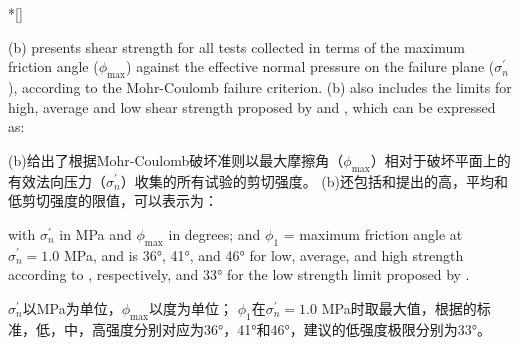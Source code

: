 \begin{ParaColumn}

    \switchcolumn[0]*[]

    (b) presents shear strength for all tests collected in terms of the maximum friction angle ($\phi_{\max}$) against the effective normal pressure on the failure plane ($\sigma_n^\prime$), according to the Mohr-Coulomb failure criterion. (b) also includes the limits for high, average and low shear strength proposed by \citet{Leps19701159} and \citet{Indraratna1994539}, which can be expressed as:

    \switchcolumn

    (b)给出了根据Mohr-Coulomb破坏准则以最大摩擦角（$\phi_{\max}$）相对于破坏平面上的有效法向压力（$\sigma_n^\prime$）收集的所有试验的剪切强度。 (b)还包括\citet{Leps19701159}和\citet{Indraratna1994539}提出的高，平均和低剪切强度的限值，可以表示为：


    \switchcolumn*

    \noindent
    with $\sigma_n^\prime$ in MPa and $\phi_{\max}$ in degrees; and $\phi_1$ = maximum friction angle at $\sigma_n^\prime=1.0$ MPa, and is 36°, 41°, and 46° for low, average, and high strength according to \citet{Leps19701159}, respectively, and 33° for the low strength limit proposed by \citet{Indraratna1994539}.

    \switchcolumn

    \noindent
    $\sigma_n^\prime$以MPa为单位，$\phi_{\max}$以度为单位； $\phi_1$在$\sigma_n^\prime=1.0$ MPa时取最大值，根据\citet{Leps19701159}的标准，低，中，高强度分别对应为36°，41°和46°，\citet{Indraratna1994539}建议的低强度极限分别为33°。

    \switchcolumn*


\end{ParaColumn}
